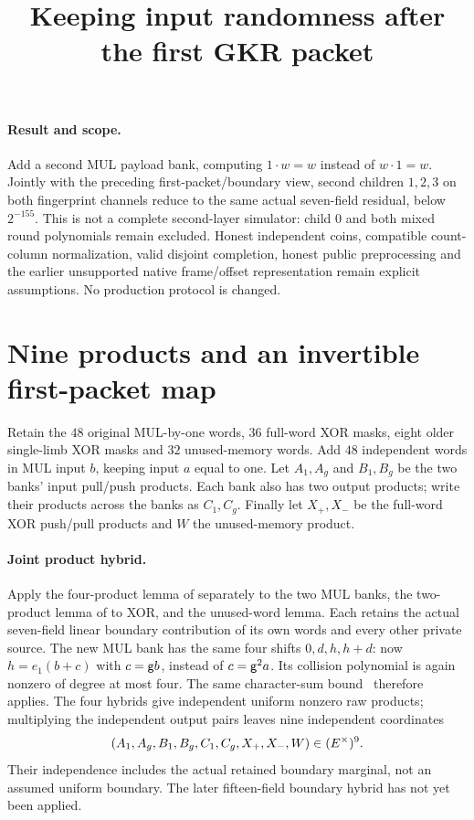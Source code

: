 \documentclass[11pt]{article}
\title{Keeping input randomness after the first GKR packet}
\author{}
\date{}
\begin{document}
\maketitle
\vspace{-2em}

\paragraph{Result and scope.} Add a second MUL payload bank, computing $1\cdot w=w$ instead of $w\cdot1=w$. Jointly with the preceding first-packet/boundary view, second children $1,2,3$ on both fingerprint channels reduce to the same actual seven-field residual, below $2^{-155}$. This is not a complete second-layer simulator: child $0$ and both mixed round polynomials remain excluded. Honest independent coins, compatible count-column normalization, valid disjoint completion, honest public preprocessing and the earlier unsupported native frame/offset representation remain explicit assumptions. No production protocol is changed.

\section{Nine products and an invertible first-packet map}

Retain the $48$ original MUL-by-one words, $36$ full-word XOR masks, eight older single-limb XOR masks and $32$ unused-memory words. Add $48$ independent words in MUL input $b$, keeping input $a$ equal to one. Let $A_1,A_g$ and $B_1,B_g$ be the two banks' input pull/push products. Each bank also has two output products; write their products across the banks as $C_1,C_g$. Finally let $X_+,X_-$ be the full-word XOR push/pull products and $W$ the unused-memory product.

\paragraph{Joint product hybrid.} Apply the four-product lemma of  separately to the two MUL banks, the two-product lemma of  to XOR, and the unused-word lemma. Each retains the actual seven-field linear boundary contribution of its own words and every other private source. The new MUL bank has the same four shifts $0,d,h,h+d$: now $h=e_1(b+c)$ with $c=\mathsf{g} b$, instead of $c=\mathsf{g}^2a$. Its collision polynomial is again nonzero of degree at most four. The same character-sum bound~\cite{winger} therefore applies. The four hybrids give independent uniform nonzero raw products; multiplying the independent output pairs leaves nine independent coordinates
\[
 (A_1,A_g,B_1,B_g,C_1,C_g,X_+,X_-,W)\in(E^\times)^9.
\]
Their independence includes the actual retained boundary marginal, not an assumed uniform boundary. The later fifteen-field boundary hybrid has not yet been applied.
\end{document}
